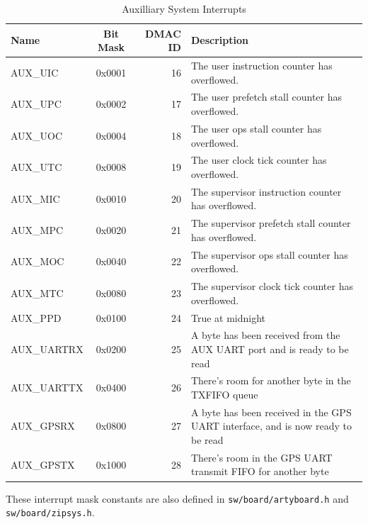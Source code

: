 \documentclass{gqtekspec}
\begin{document}
\begin{table}[htbp]
\begin{center}\begin{tabular}{|p{0.9in}|c|r|p{3.00in}|}\hline
\rowcolor[gray]{0.85} Name & Bit Mask & DMAC ID &Description \\\hline\hline
AUX\_UIC & 0x0001 & 16 & The user instruction counter has overflowed.\\\hline
AUX\_UPC & 0x0002 & 17 & The user prefetch stall counter has overflowed.\\\hline
AUX\_UOC & 0x0004 & 18 & The user ops stall counter has overflowed.\\\hline
AUX\_UTC & 0x0008 & 19 & The user clock tick counter has overflowed.\\\hline
AUX\_MIC & 0x0010 & 20 & The supervisor instruction counter has overflowed.\\\hline
AUX\_MPC & 0x0020 & 21 & The supervisor prefetch stall counter has overflowed.\\\hline
AUX\_MOC & 0x0040 & 22 & The supervisor ops stall counter has overflowed.\\\hline
AUX\_MTC & 0x0080 & 23 & The supervisor clock tick counter has overflowed.\\\hline
%
AUX\_PPD    & 0x0100 & 24& True at midnight\\\hline
AUX\_UARTRX & 0x0200 & 25& A byte has been received from the AUX UART port and is ready to be read\\\hline
AUX\_UARTTX & 0x0400 & 26& There's room for another byte in the TXFIFO queue\\\hline
AUX\_GPSRX  & 0x0800 & 27& A byte has been received in the GPS UART interface, and is now ready to be read\\\hline
AUX\_GPSTX  & 0x1000 & 28& There's room in the GPS UART transmit FIFO for another byte\\\hline
\end{tabular}
\caption{Auxilliary System Interrupts}\label{tbl:aux-ints}
\end{center}\end{table}
These interrupt mask constants are also defined in {\tt sw/board/artyboard.h}
and {\tt sw/board/zipsys.h}.
\end{document}
